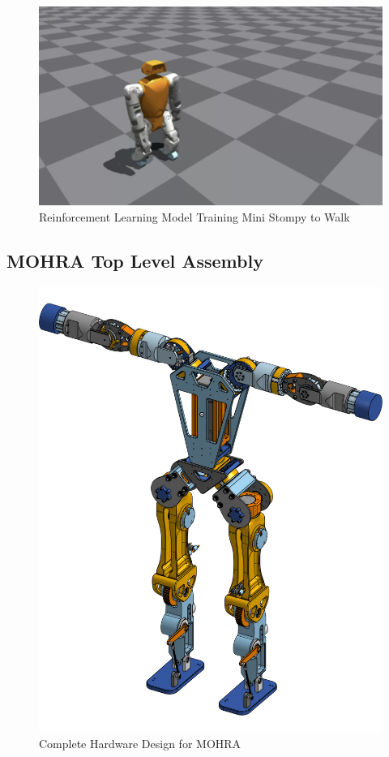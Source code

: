 \documentclass{article}
\begin{document}
\begin{figure}[H]
    \centering
    \includegraphics[scale=0.5]{assets/Design Presentation/Ministompy walking.png}
    \caption{Reinforcement Learning Model Training Mini Stompy to Walk}
    \label{fig:enter-label}
\end{figure}



\newpage
\subsection{MOHRA Top Level Assembly}

\begin{figure}[H]
    \centering
    \includegraphics[scale=0.15]{assets/MOHRA/MOHRA_Tpose.png}
    \caption{Complete Hardware Design for MOHRA}
    \label{fig:enter-label}
\end{figure}
\end{document}
